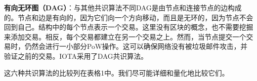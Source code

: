 \begin{translation}
\textbf{有向无环图（DAG）}：与其他共识算法不同DAG\cite{art17}是由节点和连接节点的边构成的。节点和边是有向的，因为它们向一个方向移动，而且是无环的，因为节点不会回到自己。结构中的每个节点表示一个交易。这里没有区块的概念，也不需要挖掘来添加交易。相反，每个交易都建立在另一个交易之上。然而，当节点提交一个交易时，仍然会进行一小部分PoW操作。这可以确保网络没有被垃圾邮件攻击，并验证之前的交易。IOTA\cite{art36}采用了DAG共识算法。

这六种共识算法的比较列在表格1中。我们尽可能详细和量化地比较它们。


\end{translation}
